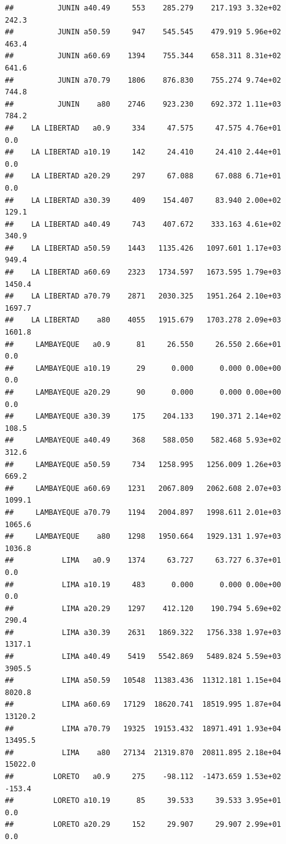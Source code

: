 \documentclass[
]{article}
\begin{document}
\begin{verbatim}
##          JUNIN a40.49     553    285.279    217.193 3.32e+02      242.3
##          JUNIN a50.59     947    545.545    479.919 5.96e+02      463.4
##          JUNIN a60.69    1394    755.344    658.311 8.31e+02      641.6
##          JUNIN a70.79    1806    876.830    755.274 9.74e+02      744.8
##          JUNIN    a80    2746    923.230    692.372 1.11e+03      784.2
##    LA LIBERTAD   a0.9     334     47.575     47.575 4.76e+01        0.0
##    LA LIBERTAD a10.19     142     24.410     24.410 2.44e+01        0.0
##    LA LIBERTAD a20.29     297     67.088     67.088 6.71e+01        0.0
##    LA LIBERTAD a30.39     409    154.407     83.940 2.00e+02      129.1
##    LA LIBERTAD a40.49     743    407.672    333.163 4.61e+02      340.9
##    LA LIBERTAD a50.59    1443   1135.426   1097.601 1.17e+03      949.4
##    LA LIBERTAD a60.69    2323   1734.597   1673.595 1.79e+03     1450.4
##    LA LIBERTAD a70.79    2871   2030.325   1951.264 2.10e+03     1697.7
##    LA LIBERTAD    a80    4055   1915.679   1703.278 2.09e+03     1601.8
##     LAMBAYEQUE   a0.9      81     26.550     26.550 2.66e+01        0.0
##     LAMBAYEQUE a10.19      29      0.000      0.000 0.00e+00        0.0
##     LAMBAYEQUE a20.29      90      0.000      0.000 0.00e+00        0.0
##     LAMBAYEQUE a30.39     175    204.133    190.371 2.14e+02      108.5
##     LAMBAYEQUE a40.49     368    588.050    582.468 5.93e+02      312.6
##     LAMBAYEQUE a50.59     734   1258.995   1256.009 1.26e+03      669.2
##     LAMBAYEQUE a60.69    1231   2067.809   2062.608 2.07e+03     1099.1
##     LAMBAYEQUE a70.79    1194   2004.897   1998.611 2.01e+03     1065.6
##     LAMBAYEQUE    a80    1298   1950.664   1929.131 1.97e+03     1036.8
##           LIMA   a0.9    1374     63.727     63.727 6.37e+01        0.0
##           LIMA a10.19     483      0.000      0.000 0.00e+00        0.0
##           LIMA a20.29    1297    412.120    190.794 5.69e+02      290.4
##           LIMA a30.39    2631   1869.322   1756.338 1.97e+03     1317.1
##           LIMA a40.49    5419   5542.869   5489.824 5.59e+03     3905.5
##           LIMA a50.59   10548  11383.436  11312.181 1.15e+04     8020.8
##           LIMA a60.69   17129  18620.741  18519.995 1.87e+04    13120.2
##           LIMA a70.79   19325  19153.432  18971.491 1.93e+04    13495.5
##           LIMA    a80   27134  21319.870  20811.895 2.18e+04    15022.0
##         LORETO   a0.9     275    -98.112  -1473.659 1.53e+02     -153.4
##         LORETO a10.19      85     39.533     39.533 3.95e+01        0.0
##         LORETO a20.29     152     29.907     29.907 2.99e+01        0.0

\end{verbatim}
\end{document}
